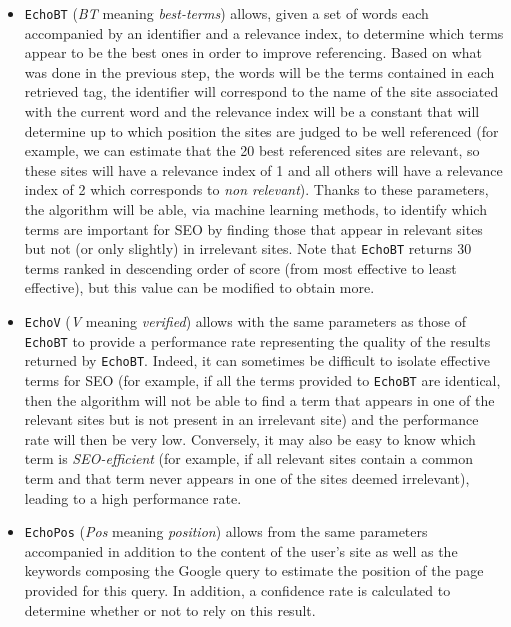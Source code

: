 \documentclass[12pt]{article}
\begin{document}
\begin{itemize}
	\item \texttt{EchoBT} (\textit{BT} meaning \textit{best-terms}) allows, given a set of words each accompanied by an identifier and a relevance index, to determine which terms appear to be the best ones in order to improve referencing. Based on what was done in the previous step, the words will be the terms contained in each retrieved tag, the identifier will correspond to the name of the site associated with the current word and the relevance index will be a constant that will determine up to which position the sites are judged to be well referenced (for example, we can estimate that the 20 best referenced sites are relevant, so these sites will have a relevance index of 1 and all others will have a relevance index of 2 which corresponds to \textit{non relevant}). Thanks to these parameters, the algorithm will be able, via machine learning methods, to identify which terms are important for SEO by finding those that appear in relevant sites but not (or only slightly) in irrelevant sites. Note that \texttt{EchoBT} returns 30 terms ranked in descending order of score (from most effective to least effective), but this value can be modified to obtain more.
	\item \texttt{EchoV} (\textit{V} meaning \textit{verified}) allows with the same parameters as those of \texttt{EchoBT} to provide a performance rate representing the quality of the results returned by \texttt{EchoBT}. Indeed, it can sometimes be difficult to isolate effective terms for SEO (for example, if all the terms provided to \texttt{EchoBT} are identical, then the algorithm will not be able to find a term that appears in one of the relevant sites but is not present in an irrelevant site) and the performance rate will then be very low. Conversely, it may also be easy to know which term is \textit{SEO-efficient} (for example, if all relevant sites contain a common term and that term never appears in one of the sites deemed irrelevant), leading to a high performance rate.
	\item \texttt{EchoPos} (\textit{Pos} meaning \textit{position}) allows from the same parameters accompanied in addition to the content of the user's site as well as the keywords composing the Google query to estimate the position of the page provided for this query. In addition, a confidence rate is calculated to determine whether or not to rely on this result.
\end{itemize}

\
\end{document}

